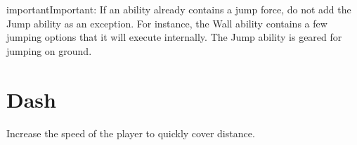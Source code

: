 \documentclass[letterpaper,11pt,english,openany,oneside]{sphinxmanual}
\begin{document}
\begin{sphinxadmonition}{important}{Important:}
\sphinxAtStartPar
If an ability already contains a jump force, do not add the Jump ability as an exception. For instance, the Wall ability
contains a few jumping options that it will execute internally. The Jump ability is geared for jumping on ground.
\end{sphinxadmonition}

\sphinxstepscope


\chapter{Dash}
\label{\detokenize{playerAbilities/dash:dash}}\label{\detokenize{playerAbilities/dash::doc}}
\sphinxAtStartPar
Increase the speed of the player to quickly cover distance.
\end{document}
